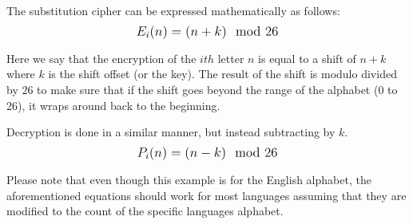 The substitution cipher can be expressed mathematically as follows: $$\mathlarger{E_i(n)=(n+k)\mod{26}}$$

Here we say that the encryption of the $ith$ letter $n$ is equal to a shift of $n+k$ where $k$ is the shift offset (or the key). The result of the shift
is modulo divided by $26$ to make sure that if the shift goes beyond the range of the alphabet (0 to 26),  it wraps around back to the beginning.

Decryption is done in a similar manner, but instead subtracting by $k$. $$\mathlarger{P_i(n)=(n-k)\mod{26}}$$

Please note that even though this example is for the English alphabet, the aforementioned equations should work for most languages assuming that they are modified
to the count of the specific languages alphabet.

